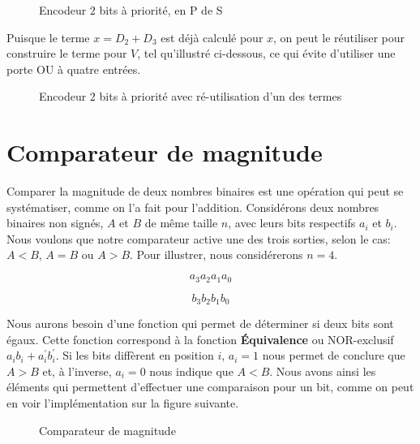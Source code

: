 \documentclass[letter, oneside]{book}
\begin{document}
\begin{enumerate}
\begin{figure}[htbp]
\centering

\caption{\label{fig:org69b979c}Encodeur 2 bits à priorité, en P de S}
\end{figure}

Puisque le terme \(x = D_2 + D_3\) est déjà calculé pour \(x\), on
peut le réutiliser pour construire le terme pour \(V\), tel
qu'illustré ci-dessous, ce qui évite d'utiliser une porte OU à quatre
entrées.

\begin{figure}[htbp]
\centering

\caption{\label{fig:org5862569}Encodeur 2 bits à priorité avec ré-utilisation d'un des termes}
\end{figure}
\end{enumerate}


\section{Comparateur de magnitude}
\label{sec:org0256e51}

Comparer la magnitude de deux nombres binaires est une opération qui
peut se systématiser, comme on l'a fait pour l'addition. Considérons
deux nombres binaires non signés, \(A\) et \(B\) de même taille \(n\),
avec leurs bits respectifs \(a_i\) et \(b_i\). Nous voulons que notre
comparateur active une des trois sorties, selon le cas: \(A < B\), \(A
= B\) ou \(A > B\). Pour illustrer, nous considérerons \(n = 4\).

$$a_3 a_2 a_1 a_0$$

$$b_3 b_2 b_1 b_0$$

Nous aurons besoin d'une fonction qui permet de déterminer si deux
bits sont égaux. Cette fonction correspond à la fonction \textbf{Équivalence}
ou NOR-exclusif \(a_i b_i + a_i^\prime b_i^\prime\).  Si les bits
diffèrent en position \(i\), \(a_i = 1\) nous permet de conclure que
\(A > B\) et, à l'inverse, \(a_i = 0\) nous indique que \(A < B\). Nous avons ainsi
les éléments qui permettent d'effectuer une comparaison pour un bit,
comme on peut en voir l'implémentation sur la figure suivante.

\begin{figure}[htbp]
\centering

\caption{\label{fig:org23ad144}Comparateur de magnitude}
\end{figure}
\end{document}
